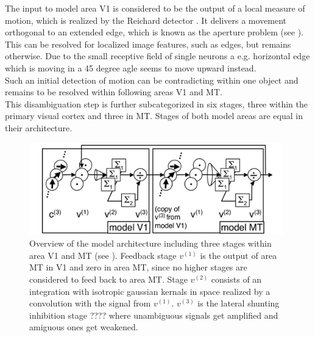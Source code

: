 \documentclass[a4paper]{article}
\begin{document}
The input to model area V1 is considered to be the output of a local measure of motion, which is realized by the Reichard detector \cite{Reichardt}. It delivers a movement orthogonal to an extended edge, which is known as the aperture problem (see \cite{Adelson82}). This can be resolved for localized image features, such as edges, but remains otherwise. Due to the small receptive field of single neurons a e.g. horizontal edge which is moving in a 45 degree agle seems to move upward instead.\\
Such an initial detection of motion can be contradicting within one object and remains to be resolved within following areas V1 and MT.\\
This disambiguation step is further subcategorized in six stages, three within the primary visual cortex and three in MT. Stages of both model areas are equal in their architecture.\\

\vspace{0.5cm}
\begin{figure}[ht]
\centering
\includegraphics[width=11cm]{bayerl1}
\caption{Overview of the model architecture including three stages within area V1 and MT (see \cite{Bayerl04}). Feedback stage $v^{(1)}$ is the output of area MT in V1 and zero in area MT, since no higher stages are considered to feed back to area MT. Stage $v^{(2)}$ consists of an integration with isotropic gaussian kernals in space realized by a convolution with the signal from $v^{(1)}$. $v^{(3)}$ is the lateral shunting inhibition stage ???? where unambiguous signals get amplified and amiguous ones get weakened.}
\label{fig:bayerl1}
\end{figure}
\vspace{0.5cm}
\end{document}
